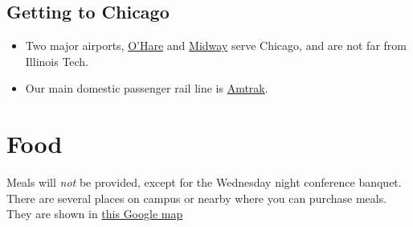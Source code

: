 \subsection{Getting to Chicago}

\begin{itemize}
  \item Two major airports, \href{https://www.flychicago.com/ohare/home/Pages/default.aspx}{O'Hare} and \href{https://www.flychicago.com/midway/pages/default.aspx}{Midway} serve Chicago, and are not far from Illinois Tech.
  \item Our main domestic passenger rail line is \href{https://www.amtrak.com/home.html}{Amtrak}.
\end{itemize}


\section{Food}

Meals will \emph{not} be provided, except for the Wednesday night conference banquet. There are several places on campus or nearby where you can purchase meals.  They are shown in \href{https://www.google.com/maps/d/u/1/edit?mid=1QH5guZDg-m8_f1oO9HgZ5sIL76q1gdk&usp=sharing}{this Google map}


